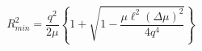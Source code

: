 \begin{equation}
R_{min}^2=\frac{q^2}{2\mu}\left\{1+\sqrt{1-\frac{\mu\ell^2(\Delta\mu)^2}{4q^4}}
\right\}\end{equation}

